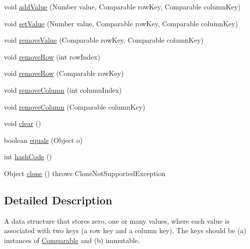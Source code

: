 \begin{DoxyCompactItemize}
void \mbox{\hyperlink{classorg_1_1jfree_1_1data_1_1_default_keyed_values2_d_a16fb58c6725b8f0a6d6301229bb87628}{add\+Value}} (Number value, Comparable row\+Key, Comparable column\+Key)
\item 
void \mbox{\hyperlink{classorg_1_1jfree_1_1data_1_1_default_keyed_values2_d_a7ce10a2e6ed2e752b8bf8a0ae1e4e048}{set\+Value}} (Number value, Comparable row\+Key, Comparable column\+Key)
\item 
void \mbox{\hyperlink{classorg_1_1jfree_1_1data_1_1_default_keyed_values2_d_a2bc7617889df5d3977fff377c0ddceb7}{remove\+Value}} (Comparable row\+Key, Comparable column\+Key)
\item 
void \mbox{\hyperlink{classorg_1_1jfree_1_1data_1_1_default_keyed_values2_d_ad0ba13bb6997d580f816f62297d7ef96}{remove\+Row}} (int row\+Index)
\item 
void \mbox{\hyperlink{classorg_1_1jfree_1_1data_1_1_default_keyed_values2_d_a3e1bb0814720de431e1ee4704e58922d}{remove\+Row}} (Comparable row\+Key)
\item 
void \mbox{\hyperlink{classorg_1_1jfree_1_1data_1_1_default_keyed_values2_d_addf0f65958a134a32cccc78d7b2e4024}{remove\+Column}} (int column\+Index)
\item 
void \mbox{\hyperlink{classorg_1_1jfree_1_1data_1_1_default_keyed_values2_d_a39f5509250ab63ae4c34f1d68767cc82}{remove\+Column}} (Comparable column\+Key)
\item 
void \mbox{\hyperlink{classorg_1_1jfree_1_1data_1_1_default_keyed_values2_d_ae62f091d9dfb48d33a26812f06bd9109}{clear}} ()
\item 
boolean \mbox{\hyperlink{classorg_1_1jfree_1_1data_1_1_default_keyed_values2_d_a4d2a2c564e7aff66a16e61288ebfb42e}{equals}} (Object o)
\item 
int \mbox{\hyperlink{classorg_1_1jfree_1_1data_1_1_default_keyed_values2_d_ad85ac47a73777119f99930ccb56d8245}{hash\+Code}} ()
\item 
Object \mbox{\hyperlink{classorg_1_1jfree_1_1data_1_1_default_keyed_values2_d_abd02697b4dd0b559d70d8a660d71997e}{clone}} ()  throws Clone\+Not\+Supported\+Exception 
\end{DoxyCompactItemize}


\subsection{Detailed Description}
A data structure that stores zero, one or many values, where each value is associated with two keys (a \textquotesingle{}row\textquotesingle{} key and a \textquotesingle{}column\textquotesingle{} key). The keys should be (a) instances of \mbox{\hyperlink{}{Comparable}} and (b) immutable. 

